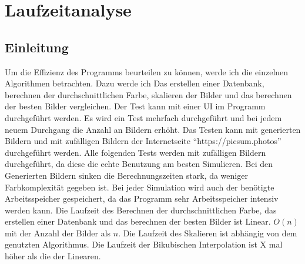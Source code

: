 \section{Laufzeitanalyse}
\subsection{Einleitung}
Um die Effizienz des Programms beurteilen zu können, werde ich die einzelnen Algorithmen betrachten. Dazu werde ich Das erstellen einer Datenbank, berechnen der durchschnittlichen Farbe, skalieren der Bilder und das berechnen der besten Bilder vergleichen. Der Test kann mit einer UI im Programm durchgeführt werden. Es wird ein Test mehrfach durchgeführt und bei jedem neuem Durchgang die Anzahl an Bildern erhöht. Das Testen kann mit generierten Bildern und mit zufälligen Bildern der Internetseite ``https://picsum.photos'' durchgeführt werden. Alle folgenden Tests werden mit zufälligen Bildern durchgeführt, da diese die echte Benutzung am besten Simulieren. Bei den Generierten Bildern sinken die Berechnungszeiten stark, da weniger Farbkomplexität gegeben ist. Bei jeder Simulation wird auch der benötigte Arbeitsspeicher gespeichert, da das Programm sehr Arbeitsspeicher intensiv werden kann. Die Laufzeit des Berechnen der durchschnittlichen Farbe, das erstellen einer Datenbank und das berechnen der besten Bilder ist Linear. $O(n)$ mit der Anzahl der Bilder als $n$. Die Laufzeit des Skalieren ist abhängig von dem genutzten Algorithmus. Die Laufzeit der Bikubischen Interpolation ist X mal höher als die der Linearen. 
